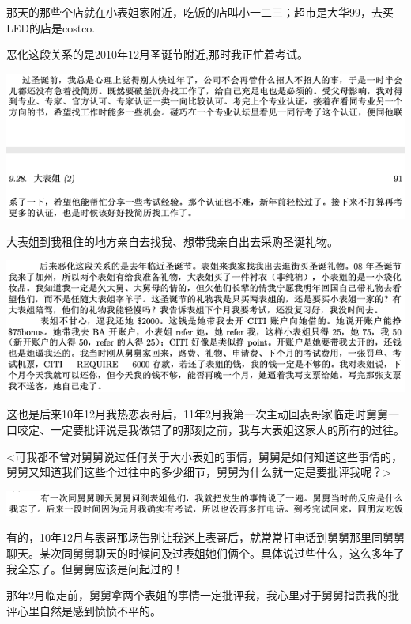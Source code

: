 \documentclass[9pt, b5paper]{article}
\begin{document}
那天的那些个店就在小表姐家附近，吃饭的店叫小一二三；超市是大华99，去买LED的店是costco.

恶化这段关系的是2010年12月圣诞节附近,那时我正忙着考试。 

\begin{center}
\includegraphics[width=.9\linewidth]{./pic/p1p91.png}
\end{center}

大表姐到我租住的地方亲自去找我、想带我亲自出去采购圣诞礼物。

\begin{center}
\includegraphics[width=.9\linewidth]{./pic/p1p48-2.png}
\end{center}

这也是后来10年12月我热恋表哥后，11年2月我第一次主动回表哥家临走时舅舅一口咬定、一定要批评说是我做错了的那刻之前，我与大表姐这家人的所有的过往。

<可我都不曾对舅舅说过任何关于大小表姐的事情，舅舅是如何知道这些事情的，舅舅又知道我们这些个过往中的多少细节，舅舅为什么就一定是要批评我呢？>

\begin{center}
\includegraphics[width=.9\linewidth]{./pic/readme_20210415_095228.png}
\end{center}

有的，10年12月与表哥那场告别让我迷上表哥后，就常常打电话到舅舅那里同舅舅聊天。某次同舅舅聊天的时候问及过表姐她们俩个。具体说过些什么，这么多年了我全忘了。但舅舅应该是问起过的！

那年2月临走前，舅舅拿两个表姐的事情一定批评我，我心里对于舅舅指责我的批评心里自然是感到愤愤不平的。 
\end{document}
